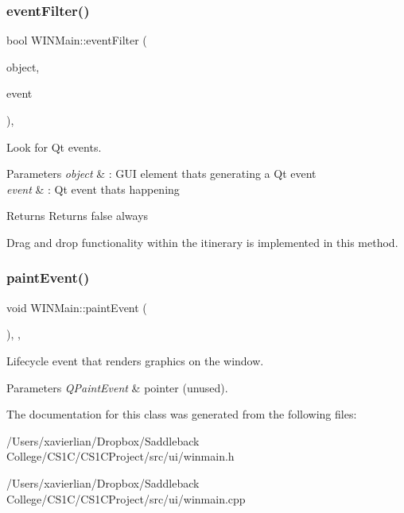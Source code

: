 \subsubsection{\texorpdfstring{eventFilter()}{eventFilter()}}
{\footnotesize\ttfamily bool W\+I\+N\+Main\+::event\+Filter (\begin{DoxyParamCaption}\item[{Q\+Object $\ast$}]{object,  }\item[{Q\+Event $\ast$}]{event }\end{DoxyParamCaption})\hspace{0.3cm}{\ttfamily [override]}, {\ttfamily [protected]}}



Look for Qt events. 


\begin{DoxyParams}{Parameters}
{\em object} & \+: G\+UI element that\textquotesingle{}s generating a Qt event \\
\hline
{\em event} & \+: Qt event that\textquotesingle{}s happening \\
\hline
\end{DoxyParams}
\begin{DoxyReturn}{Returns}
Returns false always
\end{DoxyReturn}
Drag and drop functionality within the itinerary is implemented in this method. \mbox{\label{class_w_i_n_main_a906d327c99d10704adff07b81422052e}} 
\subsubsection{\texorpdfstring{paintEvent()}{paintEvent()}}
{\footnotesize\ttfamily void W\+I\+N\+Main\+::paint\+Event (\begin{DoxyParamCaption}\item[{Q\+Paint\+Event $\ast$}]{ }\end{DoxyParamCaption})\hspace{0.3cm}{\ttfamily [override]}, {\ttfamily [protected]}, {\ttfamily [virtual]}}



Lifecycle event that renders graphics on the window. 


\begin{DoxyParams}{Parameters}
{\em Q\+Paint\+Event} & pointer (unused). \\
\hline
\end{DoxyParams}


The documentation for this class was generated from the following files\+:\begin{DoxyCompactItemize}
\item 
/\+Users/xavierlian/\+Dropbox/\+Saddleback College/\+C\+S1\+C/\+C\+S1\+C\+Project/src/ui/winmain.\+h\item 
/\+Users/xavierlian/\+Dropbox/\+Saddleback College/\+C\+S1\+C/\+C\+S1\+C\+Project/src/ui/winmain.\+cpp\end{DoxyCompactItemize}
